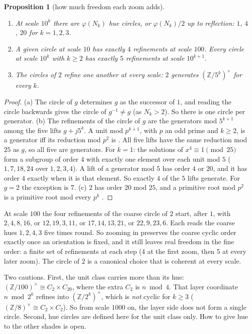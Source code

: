\documentclass[11pt]{article}
\newcommand{\Z}{\mathbb Z}
\theoremstyle{plain}
\newtheorem{proposition}[theorem]{Proposition}
\theoremstyle{definition}
\theoremstyle{remark}
\begin{document}
\begin{proposition}[how much freedom each zoom adds]\label{prop:freedom}
\leavevmode
\begin{enumerate}[nosep]
\item[(a)] At scale $10^k$ there are $\varphi(N_k)$ hue circles, or $\varphi(N_k)/2$ up to reflection:
$1$, $4$, $20$ for $k=1,2,3$.
\item[(b)] A given circle at scale $10$ has exactly $4$ refinements at scale $100$. Every circle at
scale $10^k$ with $k\ge2$ has exactly $5$ refinements at scale $10^{k+1}$.
\item[(c)] The circles of $2$ refine one another at every scale: $2$ generates $(\Z/5^k)^\times$
for every $k$.
\end{enumerate}
\end{proposition}
\begin{proof}
(a) The circle of $g$ determines $g$ as the successor of $1$, and reading the circle backwards gives
the circle of $g^{-1}\ne g$ (as $N_k>2$). So there is one circle per generator.
(b) The refinements of the circle of $g$ are the generators mod $5^{k+1}$ among the five lifts
$g+j5^k$. A unit mod $p^{k+1}$, with $p$ an odd prime and $k\ge 2$, is a generator iff its
reduction mod $p^2$ is \cite{IR}. All five lifts have the same reduction mod $25$ as $g$, so all
five are generators. For $k=1$: the solutions of $x^4\equiv1\pmod{25}$ form a subgroup of order
$4$ with exactly one element over each unit mod $5$ ($1,7,18,24$ over $1,2,3,4$). A lift of a
generator mod $5$ has order $4$ or $20$, and it has order $4$ exactly when it is that element. So
exactly $4$ of the $5$ lifts generate. For $g=2$ the exception is $7$.
(c) $2$ has order $20$ mod $25$, and a primitive root mod $p^2$ is a primitive root mod every $p^k$
\cite{IR}.
\end{proof}

\noindent
At scale $100$ the four refinements of the coarse circle of $2$ start, after $1$, with
$2,4,8,16$, or $12,19,3,11$, or $17,14,13,21$, or $22,9,23,6$. Each reads the coarse hues
$1,2,4,3$ five times round. So zooming in preserves the coarse cyclic order exactly once an
orientation is fixed, and it still leaves real freedom in the fine order: a finite set of
refinements at each step (4 at the first zoom, then 5 at every later zoom). The circle of $2$ is a
canonical choice that is coherent at every scale.

Two cautions. First, the unit class carries more than its hue: $(\Z/100)^\times\cong C_2\times
C_{20}$, where the extra $C_2$ is $n\bmod4$. That layer coordinate $n\bmod2^k$ refines into
$(\Z/2^k)^\times$, which is \emph{not} cyclic for $k\ge3$ ($(\Z/8)^\times\cong C_2\times C_2$). So
from scale $1000$ on, the layer side does not form a single circle. Second, hue circles are defined
here for the unit class only. How to give hue to the other shades is open.
\end{document}
